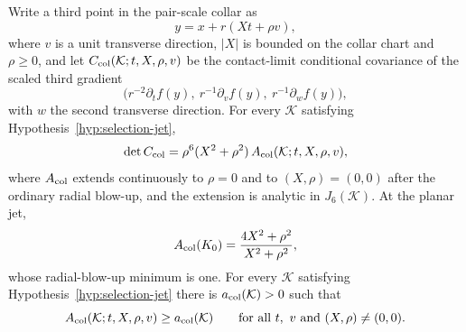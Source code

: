 \begin{lemma}\label{lem:selection-collarfactor}
Write a third point in the pair-scale collar as
\begin{equation}\label{eq:selection-collarpt2}
y=x+r(Xt+\rho v),
\end{equation}
where $v$ is a unit transverse direction, $|X|$ is bounded on the collar chart and $\rho\ge0$, and let $C_{\rm col}(\mathcal K;t,X,\rho,v)$ be the contact-limit conditional covariance of the scaled third gradient
\begin{equation}\label{eq:selection-colgrad}
\bigl(r^{-2}\partial_tf(y),\ r^{-1}\partial_vf(y),\ r^{-1}\partial_wf(y)\bigr),
\end{equation}
with $w$ the second transverse direction. For every $\mathcal K$ satisfying Hypothesis~\ref{hyp:selection-jet},
\begin{equation}\label{eq:selection-colfactor}
\det C_{\rm col}=\rho^6(X^2+\rho^2)\,A_{\rm col}(\mathcal K;t,X,\rho,v),
\end{equation}
where $A_{\rm col}$ extends continuously to $\rho=0$ and to $(X,\rho)=(0,0)$ after the ordinary radial blow-up, and the extension is analytic in $J_6(\mathcal K)$. At the planar jet,
\begin{equation}\label{eq:selection-Acol0}
A_{\rm col}(K_0)=\frac{4X^2+\rho^2}{X^2+\rho^2},
\end{equation}
whose radial-blow-up minimum is one. For every $\mathcal K$ satisfying Hypothesis~\ref{hyp:selection-jet} there is $a_{\rm col}(\mathcal K)>0$ such that
\begin{equation}\label{eq:selection-Acol}
A_{\rm col}(\mathcal K;t,X,\rho,v)\ge a_{\rm col}(\mathcal K)\qquad\text{for all }t,\ v\text{ and }(X,\rho)\ne(0,0).
\end{equation}
\end{lemma}

